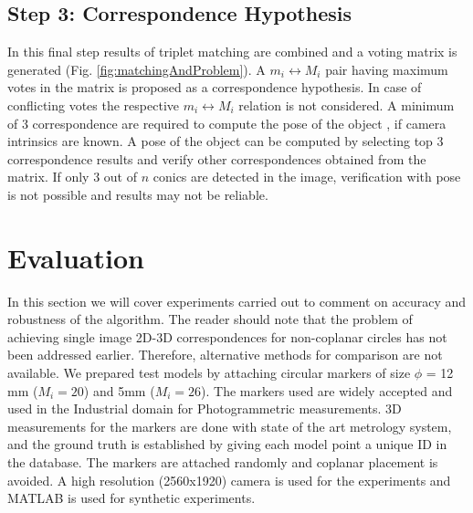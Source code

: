 \documentclass{bmvc2k}
\begin{document}
\subsection{Step 3: Correspondence Hypothesis }
\label{subSec:CHypo}
In this final step results of triplet matching are combined and a voting matrix is generated (Fig. \ref{fig:matchingAndProblem}). 
A $ m_i \leftrightarrow M_i $ pair having maximum votes in the matrix is proposed as a correspondence hypothesis. 
In case of conflicting votes the respective $ m_i \leftrightarrow M_i $ relation is not considered. 
A minimum of 3 correspondence are required to compute the pose of the object \cite{lepetit_monocular_2005}, if camera intrinsics are known. 
A pose of the object can be computed by selecting top 3 correspondence results and verify other correspondences obtained from the matrix. 
If only 3 out of $ n $ conics are detected in the image, verification with pose is not possible and results may not be reliable. 

\section{Evaluation}
In this section we will cover experiments carried out to comment on accuracy and robustness of the algorithm. 
The reader should note that the problem of achieving single image 2D-3D correspondences for non-coplanar circles has not been addressed earlier. 
Therefore, alternative methods for comparison are not available. 
We prepared test models by attaching circular markers of size $ \phi $ = 12 mm ($ M_i = 20 $) and 5mm ($ M_i  = 26$). The markers used are widely accepted and used in the Industrial domain for Photogrammetric measurements.     
3D measurements for the markers are done with state of the art metrology system, and the ground truth is established by giving each model point a unique ID in the database. 
The markers are attached randomly and coplanar placement is avoided. 
A high resolution (2560x1920) camera is used for the experiments and MATLAB is used for synthetic experiments. 
\end{document}
